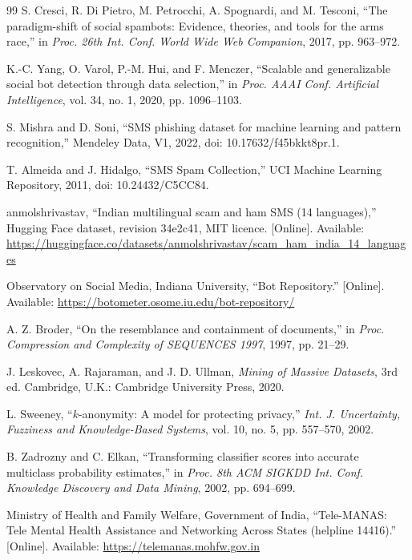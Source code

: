 \begin{thebibliography}{99}
 S. Cresci, R. Di Pietro, M. Petrocchi, A. Spognardi, and M. Tesconi, ``The paradigm-shift of social spambots: Evidence, theories, and tools for the arms race,'' in \textit{Proc. 26th Int. Conf. World Wide Web Companion}, 2017, pp. 963--972.

 K.-C. Yang, O. Varol, P.-M. Hui, and F. Menczer, ``Scalable and generalizable social bot detection through data selection,'' in \textit{Proc. AAAI Conf. Artificial Intelligence}, vol. 34, no. 1, 2020, pp. 1096--1103.

 S. Mishra and D. Soni, ``SMS phishing dataset for machine learning and pattern recognition,'' Mendeley Data, V1, 2022, doi: 10.17632/f45bkkt8pr.1.

 T. Almeida and J. Hidalgo, ``SMS Spam Collection,'' UCI Machine Learning Repository, 2011, doi: 10.24432/C5CC84.

 anmolshrivastav, ``Indian multilingual scam and ham SMS (14 languages),'' Hugging Face dataset, revision 34e2c41, MIT licence. [Online]. Available: \url{https://huggingface.co/datasets/anmolshrivastav/scam_ham_india_14_languages}

 Observatory on Social Media, Indiana University, ``Bot Repository.'' [Online]. Available: \url{https://botometer.osome.iu.edu/bot-repository/}

 A. Z. Broder, ``On the resemblance and containment of documents,'' in \textit{Proc. Compression and Complexity of SEQUENCES 1997}, 1997, pp. 21--29.

 J. Leskovec, A. Rajaraman, and J. D. Ullman, \textit{Mining of Massive Datasets}, 3rd ed. Cambridge, U.K.: Cambridge University Press, 2020.

 L. Sweeney, ``$k$-anonymity: A model for protecting privacy,'' \textit{Int. J. Uncertainty, Fuzziness and Knowledge-Based Systems}, vol. 10, no. 5, pp. 557--570, 2002.

 B. Zadrozny and C. Elkan, ``Transforming classifier scores into accurate multiclass probability estimates,'' in \textit{Proc. 8th ACM SIGKDD Int. Conf. Knowledge Discovery and Data Mining}, 2002, pp. 694--699.

 Ministry of Health and Family Welfare, Government of India, ``Tele-MANAS: Tele Mental Health Assistance and Networking Across States (helpline 14416).'' [Online]. Available: \url{https://telemanas.mohfw.gov.in}

\end{thebibliography}
